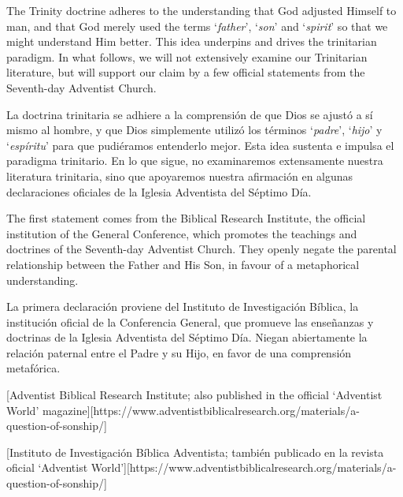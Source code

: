 The Trinity doctrine adheres to the understanding that God adjusted Himself to man, and that God merely used the terms ‘\textit{father}’, ‘\textit{son}’ and ‘\textit{spirit}’ so that we might understand Him better. This idea underpins and drives the trinitarian paradigm. In what follows, we will not extensively examine our Trinitarian literature, but will support our claim by a few official statements from the Seventh-day Adventist Church.


La doctrina trinitaria se adhiere a la comprensión de que Dios se ajustó a sí mismo al hombre, y que Dios simplemente utilizó los términos ‘\textit{padre}’, ‘\textit{hijo}’ y ‘\textit{espíritu}’ para que pudiéramos entenderlo mejor. Esta idea sustenta e impulsa el paradigma trinitario. En lo que sigue, no examinaremos extensamente nuestra literatura trinitaria, sino que apoyaremos nuestra afirmación en algunas declaraciones oficiales de la Iglesia Adventista del Séptimo Día.


The first statement comes from the Biblical Research Institute, the official institution of the General Conference, which promotes the teachings and doctrines of the Seventh-day Adventist Church. They openly negate the parental relationship between the Father and His Son, in favour of a metaphorical understanding.


La primera declaración proviene del Instituto de Investigación Bíblica, la institución oficial de la Conferencia General, que promueve las enseñanzas y doctrinas de la Iglesia Adventista del Séptimo Día. Niegan abiertamente la relación paternal entre el Padre y su Hijo, en favor de una comprensión metafórica.


[Adventist Biblical Research Institute; also published in the official ‘Adventist World’ magazine][https://www.adventistbiblicalresearch.org/materials/a-question-of-sonship/]


[Instituto de Investigación Bíblica Adventista; también publicado en la revista oficial ‘Adventist World’][https://www.adventistbiblicalresearch.org/materials/a-question-of-sonship/]


